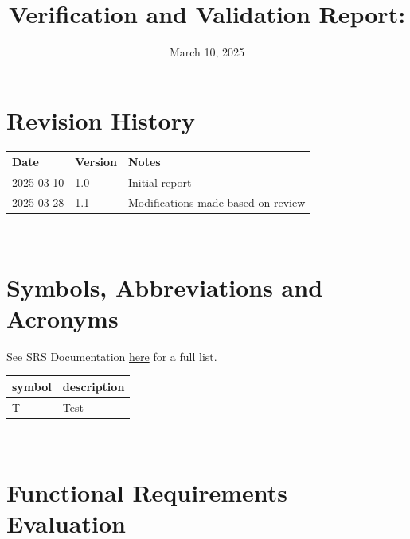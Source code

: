 \documentclass[12pt, titlepage]{article}
\begin{document}
\title{Verification and Validation Report: \progname}
\author{\authname}
\date{March 10, 2025}

\maketitle


\section{Revision History}

\begin{tabularx}{\textwidth}{p{3cm}p{2cm}X}
  \toprule {\bf Date} & {\bf Version} & {\bf Notes} \\
  \midrule
  2025-03-10              & 1.0           & Initial report\\
  2025-03-28              & 1.1           & Modifications made based on review \\
  \bottomrule
\end{tabularx}

~\newpage

\section{Symbols, Abbreviations and Acronyms}

See SRS Documentation \href{https://github.com/russellrd/realm/blob/main/docs/SRS-IEEE/SRS.pdf}{here} for a full list.\\

\renewcommand{\arraystretch}{1.2}
\begin{tabular}{l l}
  \toprule
  \textbf{symbol} & \textbf{description} \\
  \midrule
  T               & Test                 \\
  \bottomrule
\end{tabular}\\

\newpage

\tableofcontents

\listoftables %

\listoffigures %

\newpage


\section{Functional Requirements Evaluation}
\end{document}
